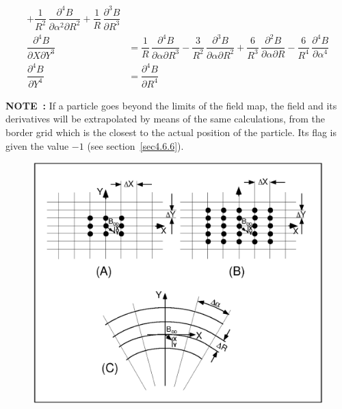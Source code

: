 {\begin{equation}
\begin{array}{ll}
	           + \dfrac{1 }{ R^2} \, \dfrac{\partial^4 B }{ \partial \alpha^2\partial R^2} 
	           + \dfrac{1 }{ R} \, \dfrac{\partial^3 B }{ \partial R^3}\\     %
	     \dfrac{ \partial^4 B }{ \partial X\partial Y^3} 
	         & = \dfrac{ 1 }{ R} \, \dfrac{\partial^4 B }{\partial \alpha \partial R^3} 
	           - \dfrac{3 }{ R^2} \, \dfrac{\partial^3 B }{ \partial \alpha \partial R^2} 
	           + \dfrac{6 }{ R^3} \, \dfrac{\partial^2 B }{ \partial \alpha\partial R} 
	           - \dfrac{6 }{ R^4} \, \dfrac{\partial^4 B }{ \partial \alpha^ 4} \\  %
	     \dfrac{ \partial^4 B }{ \partial Y^4}
	         & =   \dfrac{ \partial^4 B }{ \partial R^4}
	 \end{array} 
	\label{eq2-4-9}
\end{equation}  }
 

\noindent \textbf{NOTE~:} If a particle goes beyond the limits of the 
 field map, the field and its derivatives will be extrapolated by means of the same calculations, 
from the border grid which is the closest to the actual position of the 
particle. Its flag \IEX{} is given the value $-1$ (see section~\ref{sec4.6.6}). 


\begin{figure}[H]  %
\centerline{\includegraphics[width=15.5cm]{Fig3.ps}}
	\end{figure}

